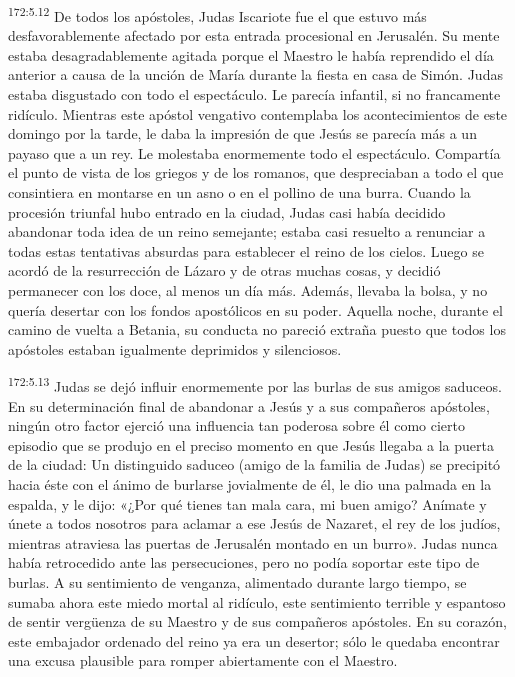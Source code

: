 \par 
\textsuperscript{172:5.12} De todos los apóstoles, Judas Iscariote fue el que estuvo más desfavorablemente afectado por esta entrada procesional en Jerusalén. Su mente estaba desagradablemente agitada porque el Maestro le había reprendido el día anterior a causa de la unción de María durante la fiesta en casa de Simón. Judas estaba disgustado con todo el espectáculo. Le parecía infantil, si no francamente ridículo. Mientras este apóstol vengativo contemplaba los acontecimientos de este domingo por la tarde, le daba la impresión de que Jesús se parecía más a un payaso que a un rey. Le molestaba enormemente todo el espectáculo. Compartía el punto de vista de los griegos y de los romanos, que despreciaban a todo el que consintiera en montarse en un asno o en el pollino de una burra. Cuando la procesión triunfal hubo entrado en la ciudad, Judas casi había decidido abandonar toda idea de un reino semejante; estaba casi resuelto a renunciar a todas estas tentativas absurdas para establecer el reino de los cielos. Luego se acordó de la resurrección de Lázaro y de otras muchas cosas, y decidió permanecer con los doce, al menos un día más. Además, llevaba la bolsa, y no quería desertar con los fondos apostólicos en su poder. Aquella noche, durante el camino de vuelta a Betania, su conducta no pareció extraña puesto que todos los apóstoles estaban igualmente deprimidos y silenciosos.

\par 
\textsuperscript{172:5.13} Judas se dejó influir enormemente por las burlas de sus amigos saduceos. En su determinación final de abandonar a Jesús y a sus compañeros apóstoles, ningún otro factor ejerció una influencia tan poderosa sobre él como cierto episodio que se produjo en el preciso momento en que Jesús llegaba a la puerta de la ciudad: Un distinguido saduceo (amigo de la familia de Judas) se precipitó hacia éste con el ánimo de burlarse jovialmente de él, le dio una palmada en la espalda, y le dijo: «¿Por qué tienes tan mala cara, mi buen amigo? Anímate y únete a todos nosotros para aclamar a ese Jesús de Nazaret, el rey de los judíos, mientras atraviesa las puertas de Jerusalén montado en un burro». Judas nunca había retrocedido ante las persecuciones, pero no podía soportar este tipo de burlas. A su sentimiento de venganza, alimentado durante largo tiempo, se sumaba ahora este miedo mortal al ridículo, este sentimiento terrible y espantoso de sentir verg\"uenza de su Maestro y de sus compañeros apóstoles. En su corazón, este embajador ordenado del reino ya era un desertor; sólo le quedaba encontrar una excusa plausible para romper abiertamente con el Maestro.